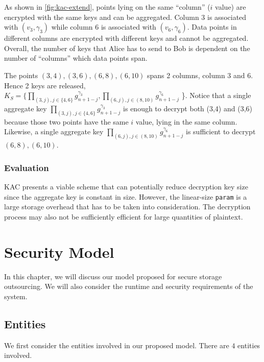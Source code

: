 \documentclass[hyp,a4paper,12pt,openbib]{socreport}
\begin{document}
As shown in \cref{fig:kac-extend}, points lying on the same ``column'' ($i$ value) are encrypted with the same keys and can be aggregated. Column 3 is associated with {$ (v_3, \gamma_3)$} while column 6 is associated with {$ (v_6, \gamma_6)$}. Data points in different columns are encrypted with different keys and cannot be aggregated. Overall, the number of keys that Alice has to send to Bob is dependent on the number of ``columns'' which data points span. 

The points $(3,4), (3,6), (6,8), (6,10)$ spans 2 columns, column 3 and 6. Hence 2 keys are released, $K_S = \{ \displaystyle  \prod_{(3,j), j \in \{4,6\} } g^{\gamma_3}_{n+1-j},  \prod_{ (6,j), j \in  (8,10)} g^{\gamma_6}_{n+1-j}$ \}. Notice that a single aggregate key $\displaystyle \prod_{(3,j), j \in \{4,6\} } g^{\gamma_3}_{n+1-j}$ is enough to decrypt both (3,4) and (3,6) because those two points have the same $i$ value, lying in the same column. Likewise, a single aggregate key $\displaystyle \prod_{ (6,j), j \in  (8,10)} g^{\gamma_6}_{n+1-j}$ is sufficient to decrypt $(6,8), (6,10)$.

\subsection{Evaluation}
KAC presents a viable scheme that can potentially reduce decryption key size since the aggregate key is constant in size. However, the linear-size \texttt{param} is a large storage overhead that has to be taken into consideration. The decryption process may also not be sufficiently efficient for large quantities of plaintext.






\chapter{Security Model}
\label{chap:model}
In this chapter, we will discuss our model proposed for secure storage outsourcing. We will also consider the runtime and security requirements of the system. 

\section{Entities}
\label{sec:scheme}
We first consider the entities involved in our proposed model.   %
There are $4$ entities involved.
\end{document}
